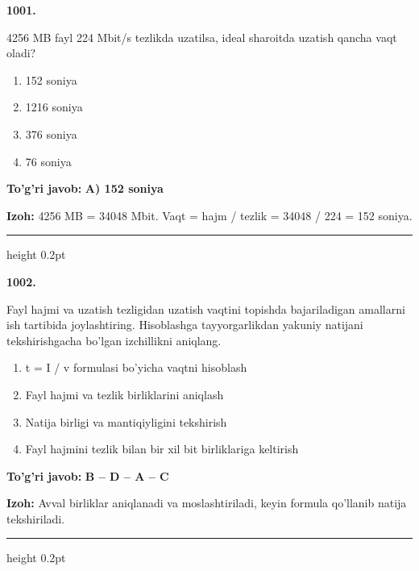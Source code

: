 \documentclass[10pt,a4paper,oneside]{article}
\begin{document}
\noindent\textbf{\color{ink}1001.}
\par
4256 MB fayl 224 Mbit/s tezlikda uzatilsa, ideal sharoitda uzatish qancha vaqt oladi?
\begin{enumerate}[label=\Alph*),leftmargin=9mm]
\item 152 soniya
\item 1216 soniya
\item 376 soniya
\item 76 soniya
\end{enumerate}
\begin{tcolorbox}[enhanced,breakable,colback=teal!4,colframe=teal!50!black,boxrule=0.5pt,arc=1.1mm,left=3mm,right=3mm,top=1.7mm,bottom=1.7mm,before skip=2mm,after skip=2mm]
\textbf{\color{teal}To'g'ri javob:} \textbf{A) 152 soniya}
\par\smallskip
\textbf{Izoh:} 4256 MB = 34048 Mbit. Vaqt = hajm / tezlik = 34048 / 224 = 152 soniya.
\end{tcolorbox}
\vspace{2mm}\hrule height 0.2pt \vspace{3mm}

\noindent\textbf{\color{ink}1002.}
\par
Fayl hajmi va uzatish tezligidan uzatish vaqtini topishda bajariladigan amallarni ish tartibida joylashtiring. Hisoblashga tayyorgarlikdan yakuniy natijani tekshirishgacha bo'lgan izchillikni aniqlang.
\begin{enumerate}[label=\Alph*),leftmargin=9mm]
\item t = I / v formulasi bo'yicha vaqtni hisoblash
\item Fayl hajmi va tezlik birliklarini aniqlash
\item Natija birligi va mantiqiyligini tekshirish
\item Fayl hajmini tezlik bilan bir xil bit birliklariga keltirish
\end{enumerate}
\begin{tcolorbox}[enhanced,breakable,colback=teal!4,colframe=teal!50!black,boxrule=0.5pt,arc=1.1mm,left=3mm,right=3mm,top=1.7mm,bottom=1.7mm,before skip=2mm,after skip=2mm]
\textbf{\color{teal}To'g'ri javob:} \textbf{B -- D -- A -- C}
\par\smallskip
\textbf{Izoh:} Avval birliklar aniqlanadi va moslashtiriladi, keyin formula qo'llanib natija tekshiriladi.
\end{tcolorbox}
\vspace{2mm}\hrule height 0.2pt \vspace{3mm}
\end{document}
